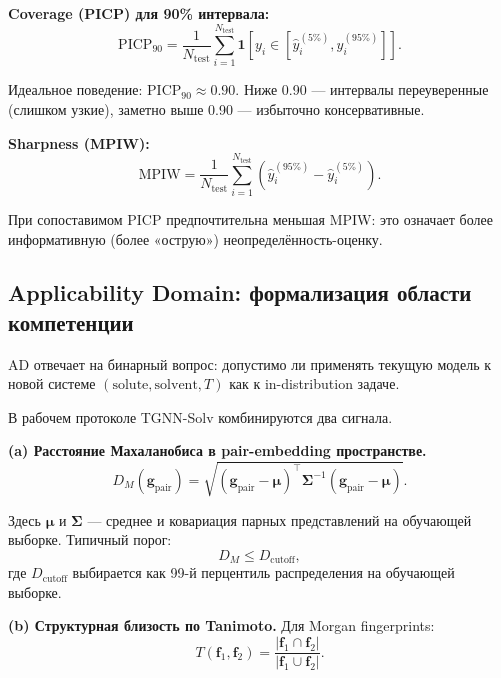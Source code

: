 \documentclass[11pt]{article}
\begin{document}
\textbf{Coverage (PICP) для 90\% интервала:}
\begin{equation*}
\mathrm{PICP}_{90} = \frac{1}{N_{\mathrm{test}}}\sum_{i=1}^{N_{\mathrm{test}}}
\mathbf{1}\!\left[y_i \in [\hat{y}_i^{(5\%)},\hat{y}_i^{(95\%)}]\right].
\end{equation*}

Идеальное поведение: $\mathrm{PICP}_{90}\approx 0.90$. Ниже 0.90 --- интервалы переуверенные (слишком узкие), заметно выше 0.90 --- избыточно консервативные.

\textbf{Sharpness (MPIW):}
\begin{equation*}
\mathrm{MPIW} = \frac{1}{N_{\mathrm{test}}}\sum_{i=1}^{N_{\mathrm{test}}}
\left(\hat{y}_i^{(95\%)}-\hat{y}_i^{(5\%)}\right).
\end{equation*}

При сопоставимом PICP предпочтительна меньшая MPIW: это означает более информативную (более «острую») неопределённость-оценку.

\subsection{Applicability Domain: формализация области компетенции}

AD отвечает на бинарный вопрос: допустимо ли применять текущую модель к новой системе $(\mathrm{solute},\mathrm{solvent},T)$ как к in-distribution задаче.

В рабочем протоколе TGNN-Solv комбинируются два сигнала.

\textbf{(a) Расстояние Махаланобиса в pair-embedding пространстве.}
\begin{equation*}
D_M(\mathbf{g}_{\mathrm{pair}})=\sqrt{
(\mathbf{g}_{\mathrm{pair}}-\boldsymbol{\mu})^{\top}
\boldsymbol{\Sigma}^{-1}
(\mathbf{g}_{\mathrm{pair}}-\boldsymbol{\mu})
}.
\end{equation*}

Здесь $\boldsymbol{\mu}$ и $\boldsymbol{\Sigma}$ --- среднее и ковариация парных представлений на обучающей выборке. Типичный порог:
\begin{equation*}
D_M \le D_{\mathrm{cutoff}},
\end{equation*}
где $D_{\mathrm{cutoff}}$ выбирается как 99-й перцентиль распределения на обучающей выборке.

\textbf{(b) Структурная близость по Tanimoto.}
Для Morgan fingerprints:
\begin{equation*}
T(\mathbf{f}_1,\mathbf{f}_2)=\frac{|\mathbf{f}_1\cap\mathbf{f}_2|}{|\mathbf{f}_1\cup\mathbf{f}_2|}.
\end{equation*}
\end{document}
